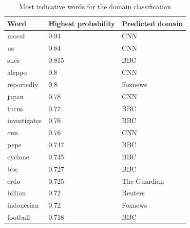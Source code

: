 \documentclass[final]{ieee}
\begin{document}
\begin{table}[htb]
\caption{Most indicative words for the domain classification}
\begin{tabularx}{\textwidth}{X|l|l}
Word & Highest probability & Predicted domain \\ \hline
mosul & 0.94 & CNN \\ \hline
us & 0.84 & CNN \\ \hline
sues & 0.815 & BBC \\ \hline
aleppo & 0.8 & CNN \\ \hline
reportedly & 0.8 & Foxnews \\ \hline
japan & 0.78 & CNN \\ \hline
turns & 0.77 & BBC \\ \hline
investigates & 0.76 & BBC \\ \hline
cnn & 0.76 & CNN \\ \hline
pepe & 0.747 & BBC \\ \hline
cyclone & 0.745 & BBC \\ \hline
bbc & 0.727 & BBC \\ \hline
erdo & 0.725 & The Guardian \\ \hline
billion & 0.72 & Reuters \\ \hline
indonesian & 0.72 & Foxnews \\ \hline
football & 0.718 & BBC \\
\end{tabularx}
\label{tab:indicativeWords}
\end{table}
\end{document}
